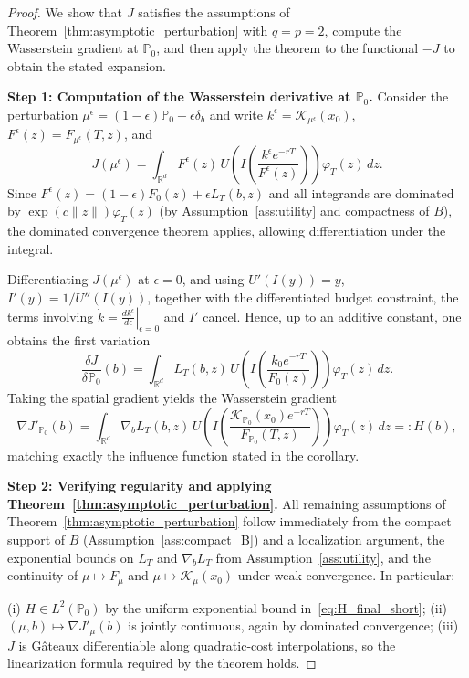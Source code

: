 \documentclass[11pt]{article}
\theoremstyle{definition}
\newcommand{\R}{\mathbb{R}}
\begin{document}
\begin{proof}
We show that $J$ satisfies the assumptions of Theorem~\ref{thm:asymptotic_perturbation} 
with $q=p=2$, compute the Wasserstein gradient at $\mathbb{P}_0$, and then apply the theorem
to the functional $-J$ to obtain the stated expansion.

\medskip
\noindent\textbf{Step 1: Computation of the Wasserstein derivative at $\mathbb{P}_0$.}
Consider the perturbation $\mu^\epsilon=(1-\epsilon)\mathbb{P}_0+\epsilon\delta_b$ and write
$k^\epsilon=\mathcal{K}_{\mu^\epsilon}(x_0)$, $F^\epsilon(z)=F_{\mu^\epsilon}(T,z)$, and
\[
J(\mu^\epsilon) = \int_{\R^d} F^\epsilon(z)\,
U\!\left(I\!\left(\frac{k^\epsilon e^{-rT}}{F^\epsilon(z)}\right)\right)\varphi_T(z)\,dz.
\]
Since $F^\epsilon(z)=(1-\epsilon)F_0(z)+\epsilon L_T(b,z)$ and all integrands are dominated by 
$\exp(c\|z\|)\varphi_T(z)$ (by Assumption~\ref{ass:utility} and compactness of $B$),
the dominated convergence theorem applies, allowing differentiation under the integral.

Differentiating $J(\mu^{\epsilon})$ at $\epsilon=0$, and using
$U'(I(y))=y$, $I'(y)=1/U''(I(y))$, together with the differentiated
budget constraint, the terms involving
$\dot{k}=\left.\frac{dk^\epsilon}{d\epsilon}\right|_{\epsilon=0}$
and $I'$ cancel. Hence, up to an additive constant, one obtains the
first variation
\[
\frac{\delta J}{\delta \mathbb{P}_0}(b)
=
\int_{\R^d}
L_T(b,z)\,
U\!\left(
I\!\left(
\frac{k_0e^{-rT}}{F_0(z)}
\right)
\right)
\varphi_T(z)\,dz.
\]
Taking the spatial gradient yields the Wasserstein gradient
\begin{equation}\label{eq:H_final_short}
\nabla J'_{\mathbb{P}_0}(b)
=
\int_{\R^d}
\nabla_bL_T(b,z)\,
U\!\left(
I\!\left(
\frac{\mathcal{K}_{\mathbb{P}_0}(x_0)e^{-rT}}
{F_{\mathbb{P}_0}(T,z)}
\right)
\right)
\varphi_T(z)\,dz
=:H(b),
\end{equation}
matching exactly the influence function stated in the corollary. 

\medskip
\noindent\textbf{Step 2: Verifying regularity and applying Theorem~\ref{thm:asymptotic_perturbation}.}
All remaining assumptions of Theorem~\ref{thm:asymptotic_perturbation} follow immediately
from the compact support of $B$ (Assumption~\ref{ass:compact_B}) and a localization argument, the exponential bounds
on $L_T$ and $\nabla_b L_T$ from Assumption~\ref{ass:utility}, and the continuity of
$\mu \mapsto F_\mu$ and $\mu \mapsto \mathcal{K}_\mu(x_0)$ under weak convergence.  
In particular:

(i) $H\in L^2(\mathbb{P}_0)$ by the uniform exponential bound in~\eqref{eq:H_final_short};  
(ii) $(\mu, b)\mapsto \nabla J'_\mu(b)$ is jointly continuous, again by dominated convergence;  
(iii) $J$ is Gâteaux differentiable along quadratic-cost interpolations, so the linearization formula required by the theorem holds.


\end{proof}
\end{document}
